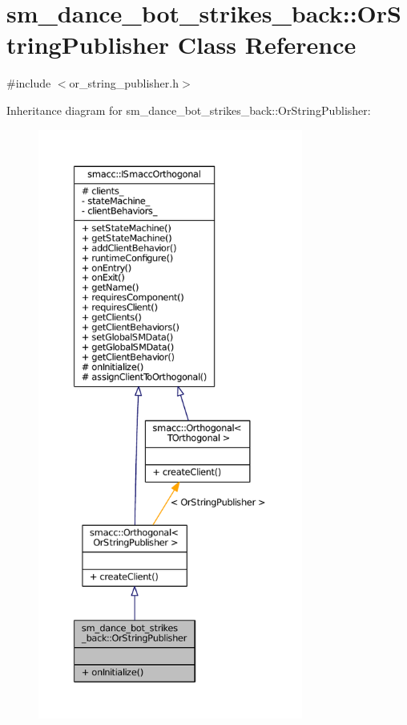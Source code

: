 \hypertarget{classsm__dance__bot__strikes__back_1_1OrStringPublisher}{}\section{sm\+\_\+dance\+\_\+bot\+\_\+strikes\+\_\+back\+:\+:Or\+String\+Publisher Class Reference}
\label{classsm__dance__bot__strikes__back_1_1OrStringPublisher}


{\ttfamily \#include $<$or\+\_\+string\+\_\+publisher.\+h$>$}



Inheritance diagram for sm\+\_\+dance\+\_\+bot\+\_\+strikes\+\_\+back\+:\+:Or\+String\+Publisher\+:
\nopagebreak
\begin{figure}[H]
\begin{center}
\leavevmode
\includegraphics[height=550pt]{classsm__dance__bot__strikes__back_1_1OrStringPublisher__inherit__graph}
\end{center}
\end{figure}


